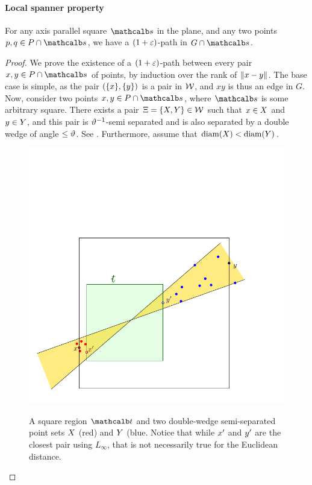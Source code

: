 \documentclass[12pt]{article}%
\begin{document}
\paragraph{Local spanner property}
\begin{lemma}
    For any axis parallel square $\sqr$ in the plane, and any two
    points $\pa, \pb \in \PS \cap \sqr$, we have a $(1+\varepsilon)$-path in
    $\restrictY{\G}{\sqr}$.
\end{lemma}
\begin{proof}
    We prove the existence of a $(1+\varepsilon)$-path between every pair
    $x,y\in \PS \cap \sqr$ of points, by induction over the rank of
    $\left\| x - y \right\|$. The base case is simple, as the pair
    $(\{x\},\{y\})$ is a pair in $\mathcal{W}$, and $xy$ is thus an edge
    in $G$. Now, consider two points $\px, \py \in \PS \cap \sqr$,
    where $\sqr$ is some arbitrary square. There exists a pair
    $\Xi = \{ X, Y \} \in \mathcal{W}$ such that $x \in X$ and
    $y \in Y$, and this pair is $\vartheta^{-1}$-semi separated and
    is also separated by a double wedge of angle $\leq \vartheta$.  See
    .  Furthermore, assume that
    $\diameterX{\PSX} < \diameterX{\PSY}$.

    \begin{figure}[h]
        \hfill%
        {\includegraphics{figs/spanner_sq}} \hfill%
        \phantom{}%
        \caption{A square region $\sqrA$ and two double-wedge
           semi-separated point sets $X$ (red) and $Y$
           (blue. Notice that while $x'$ and $y'$ are the closest
           pair using $L_\infty$, that is not necessarily true for the
           Euclidean distance.}
    \end{figure}


\end{proof}
\end{document}
